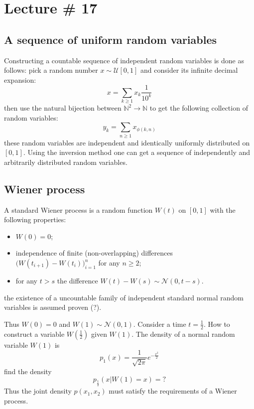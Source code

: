 \documentclass[a4paper]{article}
\newcommand{\Ncal}{\mathcal{N}}
\begin{document}
\section{Lecture \# 17} %
\label{sec:lecture_17}

\subsection{A sequence of uniform random variables} %
\label{sub:a_sequence_of_uniform_random_variables}

Constructing a countable sequence of independent random variables is done as
follows: pick a random number $x\sim \mathcal{U}[0,1]$ and consider its infinite
decimal expansion:
\[x = \sum_{k\geq 1}x_k \frac{1}{10^k}\]
then use the natural bijection between $\mathbb{N}^2\to\mathbb{N}$ to get the following
collection of random variables:
\[y_k = \sum_{n\geq 1} x_{\phi(k,n)}\]
these random variables are independent and identically uniformly distributed on $[0,1]$.
Using the inversion method one can get a sequence of independently and arbitrarily
distributed random variables.


\subsection{Wiener process} %
\label{sub:wiener_process}

A standard Wiener process is a random function $W(t)$ on $[0,1]$ with the following
properties:
\begin{itemize}
	\item $W(0) = 0$;
	\item independence of finite (non-overlapping) differences $\bigl(W(t_{i+1})-W(t_i)\bigr)_{i=1}^n$
	for any $n\geq 2$;	
	\item for any $t>s$ the difference $W(t)-W(s)\sim \Ncal(0, t-s)$.
\end{itemize}
the existence of a uncountable family of independent standard normal random variables
is assumed proven (?).

Thus $W(0) = 0$ and $W(1) \sim \Ncal(0,1)$. Consider a time $t=\frac{1}{2}$. How to
construct a variable $W(\frac{1}{2})$ given $W(1)$.
The density of a normal random variable $W(1)$ is 
\[p_1(x) = \frac{1}{\sqrt{2\pi}} e^{-\frac{x^2}{2}}\]
find the density
\[p_\frac{1}{2}(x|W(1)= x) = ?\]
Thus the joint density $p(x_1, x_2)$ must satisfy the requirements of a Wiener process.
\end{document}
